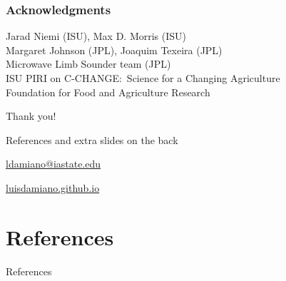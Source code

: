 \documentclass[handout]{snedecorbeamer}
\begin{document}
\begin{frame}[c]
  \frametitle{Acknowledgments}
  \centering

  {\small Jarad Niemi (ISU), Max D. Morris (ISU)\\
    Margaret Johnson (JPL), Joaquim Texeira (JPL) \\
    Microwave Limb Sounder team (JPL)\\
    ISU PIRI on C-CHANGE:~Science for a Changing Agriculture\\
    Foundation for Food and Agriculture Research}

  \vfill

  {\huge Thank you!}

  \vfill

  {\tiny References and extra slides on the back}

  \href{ldamiano@iastate.edu}{
    ldamiano@iastate.edu}

  \href{https://luisdamiano.github.io/}{
    luisdamiano.github.io}

  \vfill

\end{frame}

\appendix

\section{References}


\begin{frame}[allowframebreaks]{References}
  \tiny
  
  
\end{frame}
\end{document}
